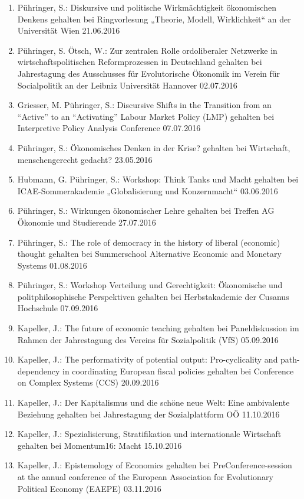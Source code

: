 \begin{enumerate}
	\item Pühringer, S.: Diskursive und politische Wirkmächtigkeit ökonomischen Denkens gehalten bei Ringvorlesung „Theorie, Modell, Wirklichkeit“ an der Universität Wien 21.06.2016
	\item Pühringer, S. Ötsch, W.: Zur zentralen Rolle ordoliberaler Netzwerke in wirtschaftspolitischen Reformprozessen in Deutschland gehalten bei Jahrestagung des Ausschusses für Evolutorische Ökonomik im Verein für Socialpolitik an der Leibniz Universität Hannover 02.07.2016
	\item Griesser, M. Pühringer, S.: Discursive Shifts in the Transition from an “Active” to an “Activating” Labour Market Policy (LMP) gehalten bei Interpretive Policy Analysis Conference 07.07.2016
	\item Pühringer, S.: Ökonomisches Denken in der Krise? gehalten bei Wirtschaft, menschengerecht gedacht? 23.05.2016
	\item Hubmann, G. Pühringer, S.: Workshop: Think Tanks und Macht gehalten bei ICAE-Sommerakademie „Globalisierung und Konzernmacht“ 03.06.2016
	\item Pühringer, S.: Wirkungen ökonomischer Lehre gehalten bei Treffen AG Ökonomie und Studierende 27.07.2016
	\item Pühringer, S.: The role of democracy in the history of liberal (economic) thought gehalten bei Summerschool Alternative Economic and Monetary Systems 01.08.2016
	\item Pühringer, S.: Workshop Verteilung und Gerechtigkeit: Ökonomische und politphilosophische Perspektiven gehalten bei Herbstakademie der Cusanus Hochschule 07.09.2016
	\item Kapeller, J.: The future of economic teaching gehalten bei Paneldiskussion im Rahmen der Jahrestagung des Vereins für Sozialpolitik (VfS) 05.09.2016
	\item Kapeller, J.: The performativity of potential output: Pro-cyclicality and path-dependency in coordinating European fiscal policies gehalten bei Conference on Complex Systems (CCS) 20.09.2016
	\item Kapeller, J.: Der Kapitalismus und die schöne neue Welt: Eine ambivalente Beziehung gehalten bei Jahrestagung der Sozialplattform OÖ 11.10.2016
	\item Kapeller, J.: Spezialisierung, Stratifikation und internationale Wirtschaft gehalten bei Momentum16: Macht 15.10.2016
	\item Kapeller, J.: Epistemology of Economics gehalten bei PreConference-session at the annual conference of the European Association for Evolutionary Political Economy (EAEPE) 03.11.2016

\end{enumerate}
